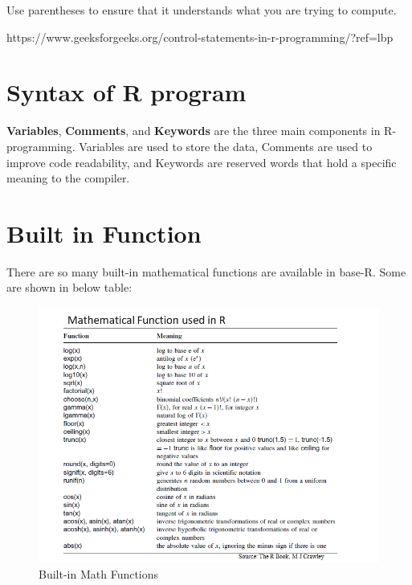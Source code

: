 \documentclass[
  letterpaper,
  DIV=11,
  numbers=noendperiod]{scrreprt}
\begin{document}
Use parentheses to ensure that it understands what you are trying to
compute.

https://www.geeksforgeeks.org/control-statements-in-r-programming/?ref=lbp

\hypertarget{syntax-of-r-program}{%
\section{Syntax of R program}\label{syntax-of-r-program}}

\textbf{Variables}, \textbf{Comments}, and \textbf{Keywords} are the
three main components in R- programming. Variables are used to store the
data, Comments are used to improve code readability, and Keywords are
reserved words that hold a specific meaning to the compiler.

\hypertarget{built-in-function}{%
\section{Built in Function}\label{built-in-function}}

There are so many built-in mathematical functions are available in
base-R. Some are shown in below table:

\begin{figure}

\caption{Built-in Math Functions}

{\centering \includegraphics{Image/Table_math_function.png}

}

\end{figure}
\end{document}
